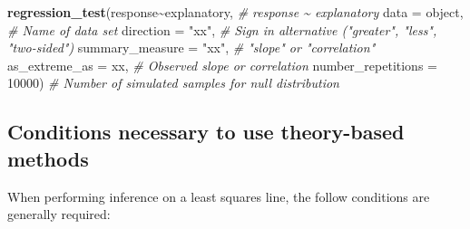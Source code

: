 \documentclass[
]{report}
\newenvironment{Shaded}{\begin{snugshade}}{\end{snugshade}}
\newcommand{\AttributeTok}[1]{\textcolor[rgb]{0.13,0.29,0.53}{#1}}
\newcommand{\CommentTok}[1]{\textcolor[rgb]{0.56,0.35,0.01}{\textit{#1}}}
\newcommand{\DecValTok}[1]{\textcolor[rgb]{0.00,0.00,0.81}{#1}}
\newcommand{\FunctionTok}[1]{\textcolor[rgb]{0.13,0.29,0.53}{\textbf{#1}}}
\newcommand{\NormalTok}[1]{#1}
\newcommand{\SpecialCharTok}[1]{\textcolor[rgb]{0.81,0.36,0.00}{\textbf{#1}}}
\newcommand{\StringTok}[1]{\textcolor[rgb]{0.31,0.60,0.02}{#1}}
\begin{document}
\begin{Shaded}
\begin{Highlighting}[]
\FunctionTok{regression\_test}\NormalTok{(response}\SpecialCharTok{\textasciitilde{}}\NormalTok{explanatory, }\CommentTok{\# response \textasciitilde{} explanatory}
               \AttributeTok{data =}\NormalTok{ object, }\CommentTok{\# Name of data set}
               \AttributeTok{direction =} \StringTok{"xx"}\NormalTok{, }\CommentTok{\# Sign in alternative ("greater", "less", "two{-}sided")}
               \AttributeTok{summary\_measure =} \StringTok{"xx"}\NormalTok{, }\CommentTok{\# "slope" or "correlation"}
               \AttributeTok{as\_extreme\_as =}\NormalTok{ xx, }\CommentTok{\# Observed slope or correlation}
               \AttributeTok{number\_repetitions =} \DecValTok{10000}\NormalTok{) }\CommentTok{\# Number of simulated samples for null distribution}
\end{Highlighting}
\end{Shaded}

\subsection*{Conditions necessary to use theory-based methods}\label{conditions-necessary-to-use-theory-based-methods}

When performing inference on a least squares line, the follow conditions are generally required:
\end{document}
